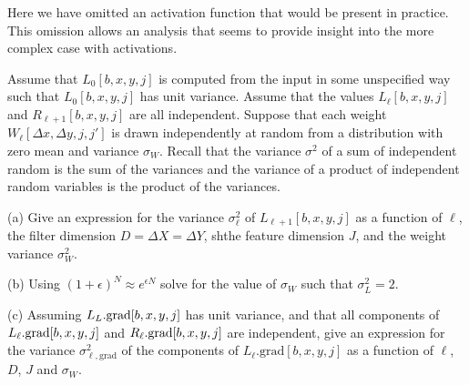 \documentclass{article}
\newcommand{\solution}[1]{}
\begin{document}
Here we have omitted an activation function that would be present in practice.  This omission allows an analysis that seems to provide insight
into the more complex case with activations.

Assume that $L_0[b,x,y,j]$
is computed from the input in some unspecified way such that $L_0[b,x,y,j]$ has unit variance.
Assume that the values $L_\ell[b,x,y,j]$  and $R_{\ell+1}[b,x,y,j]$ are all independent.
Suppose that each weight $W_\ell[\Delta x,\Delta y,j,j']$ is drawn independently at random
from a distribution with zero mean and variance $\sigma_W$. Recall that the variance $\sigma^2$ of
a sum of independent random is the sum of the variances and the variance of a product of independent random variables is the product of the variances.

\medskip
(a) Give an expression for
the variance $\sigma^2_\ell$ of $L_{\ell+1}[b,x,y,j]$ as a function of $\ell$, the filter dimension $D = \Delta X = \Delta Y$,
shthe feature dimension $J$, and the weight variance $\sigma_W^2$.

\solution{
Assuming everything is independent we have

\begin{eqnarray*}
\sigma^2_{\ell+1} & = & \sigma^2_{\ell} + D^2J\sigma^2_w\sigma^2_{\ell} \\
\\
& = & \sigma^2_\ell(1 + D^2J\sigma^2_w)
\end{eqnarray*}

This gives
$$\sigma^2_\ell = (1 + D^2J\sigma^2_w)^\ell$$
} 

\medskip
(b) Using $(1+\epsilon)^N \approx e^{\epsilon N}$ solve for the value of $\sigma_W$ such that $\sigma^2_L = 2$.

\solution{

\begin{eqnarray*}
\sigma^2_L & = & (1 + D^2J\sigma^2_w)^L \\
\\
& \approx & e^{LD^2J\sigma_W^2}
\end{eqnarray*}

setting
$$e^{LD^2J\sigma_W^2} = 2$$
gives
$$\sigma_w \approx \sqrt{\frac{\ln 2}{LD^2J}}$$
}

\medskip
(c) Assuming $L_L.\mathrm{grad}[b,x,y,j]$ has unit variance, and that all components of $L_\ell.\mathrm{grad}[b,x,y,j]$ and $R_\ell.\mathrm{grad}[b,x,y,j]$ are independent,
give an expression for the variance
$\sigma^2_{\ell,\mathrm{grad}}$ of the components of $L_\ell.\mathrm{grad}[b,x,y,j]$ as a function of $\ell$, $D$, $J$ and $\sigma_W$.

\solution{
  We have

  \medskip
  For $b,x,y,j,\Delta x, \Delta y, j'$
  $$L_{\ell}.\grad[b,x+\Delta x,y+\Delta y,j'] \;\pluseq \;W_{\ell+1}.\mathrm{grad}[\Delta x, \Delta y,j,j']L_{\ell+1}.\mathrm{grad}[b,x,y,j]$$

  which gives

$$\sigma^2_{\ell,\mathrm{grad}} = (1 + D^2J\sigma^2_W)^{L-\ell}$$
}
\end{document}

